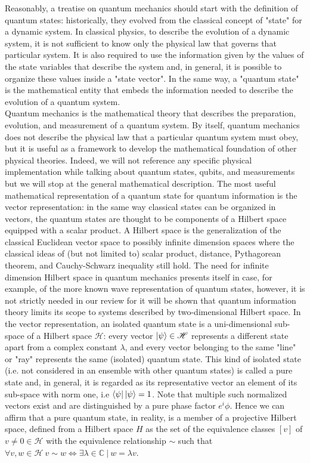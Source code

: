 \documentclass[journal, letterpaper]{IEEEtran}
\begin{document}
Reasonably, a treatise on quantum mechanics should start with the definition of quantum states: historically, they evolved from the classical concept of "state" for a dynamic system. In classical physics, to describe the evolution of a dynamic system, it is not sufficient to know only the physical law that governs that particular system. It is also required to use the information given by the values of the state variables that describe the system and, in general, it is possible to organize these values inside a "state vector". 
In the same way, a "quantum state" is the mathematical entity that embeds the information needed to describe the evolution of a quantum system.\\ 
Quantum mechanics is the mathematical theory that describes the preparation, evolution, and measurement of a quantum system. By itself, quantum mechanics does not describe the physical law that a particular quantum system must obey, but it is useful as a framework to develop the mathematical foundation of other physical theories. Indeed, we will not reference any specific physical implementation while talking about quantum states, qubits, and measurements but we will stop at the general mathematical description.
The most useful mathematical representation of a quantum state for quantum information is the vector representation: in the same way classical states can be organized in vectors, the quantum states are thought to be components of a Hilbert space equipped with a scalar product. 
A Hilbert space is the generalization of the classical Euclidean vector space to possibly infinite dimension spaces where the classical ideas of (but not limited to) scalar product, distance, Pythagorean theorem, and Cauchy-Schwarz inequality still hold. The need for infinite dimension Hilbert space in quantum mechanics presents itself in case, for example, of the more known wave representation of quantum states, however, it is not strictly needed in our review for it will be shown that quantum information theory limits its scope to systems described by two-dimensional Hilbert space. 
In the vector representation, an isolated quantum state is a uni-dimensional sub-space of a Hilbert space $\mathscr{H}$: every vector $\ket{\psi} \in \mathscr{H}$ represents a different state apart from a complex constant $\lambda$, and every vector belonging to the same "line" or "ray" represents the same (isolated) quantum state. 
This kind of isolated state (i.e. not considered in an ensemble with other quantum states) is called a pure state and, in general, it is regarded as its representative vector an element of its sub-space with norm one, i.e $\bra{\psi}\ket{\psi} = 1$. Note that multiple such normalized vectors exist and are distinguished by a pure phase factor $e^i\phi$. Hence we can affirm that a pure quantum state, in reality, is a member of a projective Hilbert space, defined from a Hilbert space $H$ as the set of the equivalence classes $[v]$ of $ v \neq 0 \in \mathscr{H}$ with the equivalence relationship $\sim$ such that \( \forall v, w \in \mathscr{H} \: v \sim w \iff \exists\lambda \in \mathbb{C}\:|\: w = \lambda v \).
\end{document}
